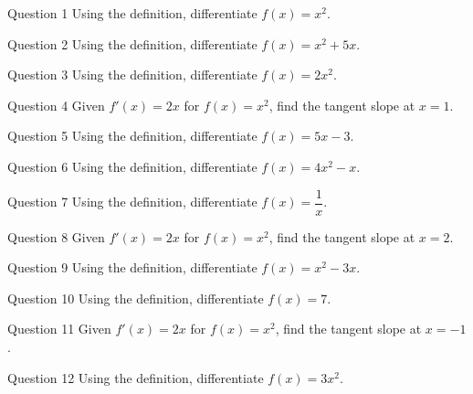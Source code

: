 \documentclass[11pt]{article}
\begin{document}
\begin{qbox}{Question 1}
Using the definition, differentiate $f(x)=x^2$.\workspace{2.4cm}
\end{qbox}

\begin{qbox}{Question 2}
Using the definition, differentiate $f(x)=x^2+5x$.\workspace{2.4cm}
\end{qbox}

\begin{qbox}{Question 3}
Using the definition, differentiate $f(x)=2x^2$.\workspace{2.4cm}
\end{qbox}

\begin{qbox}{Question 4}
Given $f'(x)=2x$ for $f(x)=x^2$, find the tangent slope at $x=1$.\workspace{2.4cm}
\end{qbox}

\begin{qbox}{Question 5}
Using the definition, differentiate $f(x)=5x-3$.\workspace{2.4cm}
\end{qbox}

\begin{qbox}{Question 6}
Using the definition, differentiate $f(x)=4x^2-x$.\workspace{2.4cm}
\end{qbox}

\begin{qbox}{Question 7}
Using the definition, differentiate $f(x)=\dfrac1x$.\workspace{2.4cm}
\end{qbox}

\begin{qbox}{Question 8}
Given $f'(x)=2x$ for $f(x)=x^2$, find the tangent slope at $x=2$.\workspace{2.4cm}
\end{qbox}

\begin{qbox}{Question 9}
Using the definition, differentiate $f(x)=x^2-3x$.\workspace{2.4cm}
\end{qbox}

\begin{qbox}{Question 10}
Using the definition, differentiate $f(x)=7$.\workspace{2.4cm}
\end{qbox}

\begin{qbox}{Question 11}
Given $f'(x)=2x$ for $f(x)=x^2$, find the tangent slope at $x=-1$.\workspace{2.4cm}
\end{qbox}

\begin{qbox}{Question 12}
Using the definition, differentiate $f(x)=3x^2$.\workspace{2.4cm}
\end{qbox}
\end{document}
